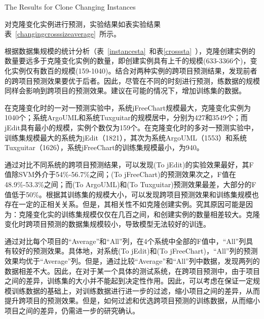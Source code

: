 {The Results for Clone Changing Instances}

对克隆变化实例进行预测，实验结果如表实验结果表~\ref{changingcrosssizeaverage}~所示。

根据数据集规模的统计分析（表~\ref{instancesta}~和表\ref{crosssta}~），克隆创建实例的数量要远多于克隆变化实例的数量，即创建实例具有上千的规模(633-3366个)，变化实例仅有数百的规模(159-1040)。结合对两种实例的跨项目预测结果，发现前者的跨项目预测效果要优于后者。因此，尽管在不同的时刻进行预测，练数据的规模同样会影响到跨项目的预测效果。建议在可能的情况下，增加训练集的数据。

在克隆变化时的一对一预测实验中，系统jFreeChart规模最大，克隆变化实例为1040个；系统ArgoUML和系统Tuxguitar的规模居中，分别为427和3549个；而jEdit具有最小的规模，实例个数仅为159个。在克隆变化时的多对一预测实验中，训练集规模最大的系统为jEdit（1821），其次为系统ArgoUML（1553）和系统Tuxguitar（1626），系统jFreeChart的训练集规模最小，为940。

通过对比不同系统的跨项目预测结果，可以发现(To jEdit)的实验效果最好，其F值除SVM外介于54\%-56.7\%之间；(To jFreeChart)的预测效果次之，F值在48.9\%-53.3\%之间；而(To ArgoUML)和(To Tuxguitar)预测效果最差，大部分的F值低于50\%。根据其训练集的规模大小，可以发现跨项目预测效果和训练集规模也存在一定的正相关关系。但是，其相关性不如克隆创建实例。究其原因可能是因为：克隆变化实的训练集规模仅仅在几百之间，和创建实例的数量相差较大。克隆变化时跨项目预测的数据集规模较小，导致模型无法较好的训连。%

通过对比每个项目的“Average”和“All”列，在4个系统中全部的F值中，“All”列具有较好的预测效果。具体地，对系统(To jEdit)和(To jFreeChart)，“All”列的预测效果均优于“Average”列。但是，通过比较“Average”和“All”列中数据，发现两列的数据相差不大。因此，在对于某一个具体的测试系统，在跨项目预测中，由于项目之间的差异，训练集的大小并不能起到决定性作用。因此，可以考虑在保证一定规模训练数据的基础上，对训练数据进行进一步的过滤，缩小项目之间的差异，从而提升跨项目的预测效果。但是，如何过滤和优选跨项目预测的训练数据，从而缩小项目之间的差异，仍需进一步的研究确认。

